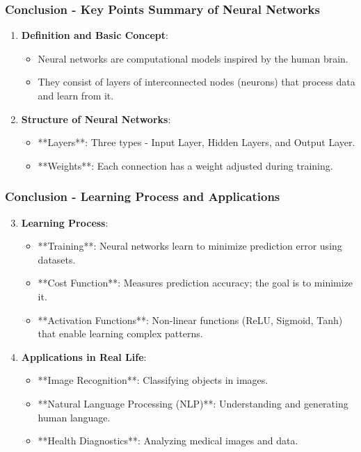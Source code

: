 \documentclass[aspectratio=169]{beamer}
\begin{document}
\begin{frame}[fragile]
    \frametitle{Conclusion - Key Points Summary of Neural Networks}
    \begin{enumerate}
        \item \textbf{Definition and Basic Concept}:
        \begin{itemize}
            \item Neural networks are computational models inspired by the human brain. 
            \item They consist of layers of interconnected nodes (neurons) that process data and learn from it.
        \end{itemize}
        
        \item \textbf{Structure of Neural Networks}:
        \begin{itemize}
            \item **Layers**: Three types - Input Layer, Hidden Layers, and Output Layer.
            \item **Weights**: Each connection has a weight adjusted during training.
        \end{itemize}
    \end{enumerate}
\end{frame}

\begin{frame}[fragile]
    \frametitle{Conclusion - Learning Process and Applications}
    \begin{enumerate}
        \setcounter{enumi}{2} %
        \item \textbf{Learning Process}:
        \begin{itemize}
            \item **Training**: Neural networks learn to minimize prediction error using datasets.
            \item **Cost Function**: Measures prediction accuracy; the goal is to minimize it.
            \item **Activation Functions**: Non-linear functions (ReLU, Sigmoid, Tanh) that enable learning complex patterns.
        \end{itemize}
        
        \item \textbf{Applications in Real Life}:
        \begin{itemize}
            \item **Image Recognition**: Classifying objects in images.
            \item **Natural Language Processing (NLP)**: Understanding and generating human language.
            \item **Health Diagnostics**: Analyzing medical images and data.
        \end{itemize}
    \end{enumerate}
\end{frame}
\end{document}
